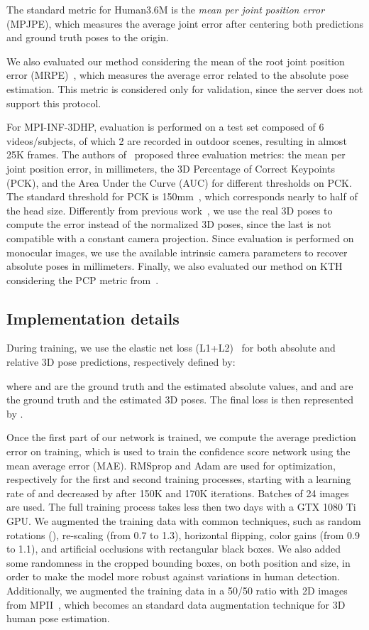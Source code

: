 \documentclass[10pt,twocolumn,letterpaper]{article}
\newcommand{\rev}[1]{#1}
\newcommand{\revb}[1]{{#1}}
\begin{document}
The standard metric for Human3.6M is the \textit{mean per joint position error}
(MPJPE), which measures the average joint error after centering both
predictions and ground truth poses to the origin.
\rev{
  We also evaluated our method considering the mean of the root joint position
  error (MRPE)~\cite{Moon_2019_ICCV}, which measures the average error related
  to the absolute pose estimation. This metric is considered only for
  validation, since the server does not support this protocol.
}


For MPI-INF-3DHP, evaluation is performed on a test set composed of
6 videos/subjects, of which 2 are recorded in outdoor scenes, resulting in
almost 25K frames.
The authors of~\cite{Mehta_2017_3DV} proposed three evaluation metrics: the mean
per joint position error, in millimeters,
the 3D Percentage of Correct Keypoints (PCK), and the Area Under the Curve (AUC)
for different thresholds on PCK. The standard threshold for PCK is 150mm~\revb{\cite{Mehta_2017_3DV}, which corresponds nearly to half of the head size}.
\revb{Differently from previous work~\cite{Mehta_2017_3DV, Kocabas_2019_CVPR, Zhou_2017_ICCV}}, we use the real 3D poses to compute the error
instead of the normalized 3D poses, since the last is not compatible with a constant
camera projection. Since evaluation is performed on monocular images, we use
the available intrinsic camera parameters to recover absolute poses in
millimeters.
\revb{Finally, we also evaluated our method on KTH considering the PCP metric from~\cite{burenius_3d_2013}.}


\subsection{Implementation details}

During training, we use the elastic net loss (L1+L2)~\cite{Zou05regularizationand} for both absolute
 and relative 3D pose predictions, respectively defined by:


where  and  are the ground truth and the estimated absolute
 values, and  and  are the ground truth and the
estimated 3D poses. The final loss is then represented
by .


Once the first part of our network is trained, we compute the average prediction
error  on training, which is used to train the confidence score
network using the mean average error (MAE).
RMSprop and Adam are used for optimization, respectively for the first and
second training processes, starting with a learning rate of  and decreased
by  after 150K and 170K iterations. Batches of 24 images are used.
The full training process takes less then two days with a GTX 1080 Ti GPU.  We augmented
the training data with common techniques, such as random rotations
(), re-scaling (from 0.7 to 1.3), horizontal flipping, color gains
(from 0.9 to 1.1), and artificial occlusions with rectangular black boxes.
\revb{We also added some randomness in the cropped bounding boxes, on both position and size, in order to make the model more robust against variations in human detection}.
Additionally, we augmented the training data in a 50/50 ratio with 2D images
from MPII~\cite{Andriluka_2014_CVPR}, which becomes an standard
data augmentation technique for 3D human pose estimation.
\end{document}
